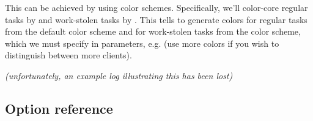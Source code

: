 \documentclass{article}
\begin{document}
This can be achieved by using color schemes. Specifically, we'll color-core regular tasks by  and work-stolen tasks by . This tells \splot{} to generate colors for regular tasks from the default color scheme and for work-stolen tasks from the  color scheme, which we must specify in  parameters, e.g.  (use more colors if you wish to distinguish between more clients).

\emph{(unfortunately, an example log illustrating this has been lost)}

\pagebreak
\subsection{Option reference}
\end{document}
